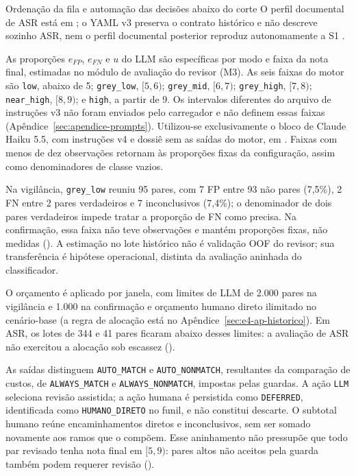 \begin{chapter}{Ordenação da fila e automação das decisões abaixo do corte}
O perfil documental de ASR está em ; o YAML v3 preserva o contrato histórico e não descreve sozinho ASR, nem o perfil documental posterior reproduz autonomamente a S1 \cite{Jardim2026phdrepo}.

As proporções $e_{FP}$, $e_{FN}$ e $u$ do LLM são específicas por modo e faixa da nota final, estimadas no módulo de avaliação do revisor (M3). As seis faixas do motor são \texttt{low}, abaixo de 5; \texttt{grey\_low}, $[5,6)$; \texttt{grey\_mid}, $[6,7)$; \texttt{grey\_high}, $[7,8)$; \texttt{near\_high}, $[8,9)$; e \texttt{high}, a partir de 9. Os intervalos diferentes do arquivo de instruções v3 não foram enviados pelo carregador e não definem essas faixas (Apêndice~\ref{sec:apendice-prompts}). Utilizou-se exclusivamente o bloco de Claude Haiku 5.5, com instruções v4 e dossiê sem as saídas do motor, em . Faixas com menos de dez observações retornam às proporções fixas da configuração, assim como denominadores de classe vazios.

Na vigilância, \texttt{grey\_low} reuniu 95 pares, com 7 FP entre 93 não pares (7,5\%), 2 FN entre 2 pares verdadeiros e 7 inconclusivos (7,4\%); o denominador de dois pares verdadeiros impede tratar a proporção de FN como precisa. Na confirmação, essa faixa não teve observações e mantém proporções fixas, não medidas (). A estimação no lote histórico não é validação OOF do revisor; sua transferência é hipótese operacional, distinta da avaliação aninhada do classificador.

O orçamento é aplicado por janela, com limites de LLM de 2.000 pares na vigilância e 1.000 na confirmação e orçamento humano direto ilimitado no cenário-base (a regra de alocação está no Apêndice~\ref{sec:e4-ap-historico}). Em ASR, os lotes de 344 e 41 pares ficaram abaixo desses limites: a avaliação de ASR não exercitou a alocação sob escassez ().

As saídas distinguem \texttt{AUTO\_MATCH} e \texttt{AUTO\_NONMATCH}, resultantes da comparação de custos, de \texttt{ALWAYS\_MATCH} e \texttt{ALWAYS\_NONMATCH}, impostas pelas guardas. A ação \texttt{LLM} seleciona revisão assistida; a ação humana é persistida como \texttt{DEFERRED}, identificada como \texttt{HUMANO\_DIRETO} no funil, e não constitui descarte. O subtotal humano reúne encaminhamentos diretos e inconclusivos, sem ser somado novamente aos ramos que o compõem. Esse aninhamento não pressupõe que todo par revisado tenha nota final em $[5,9)$: pares altos não aceitos pela guarda também podem requerer revisão ().


\end{chapter}

